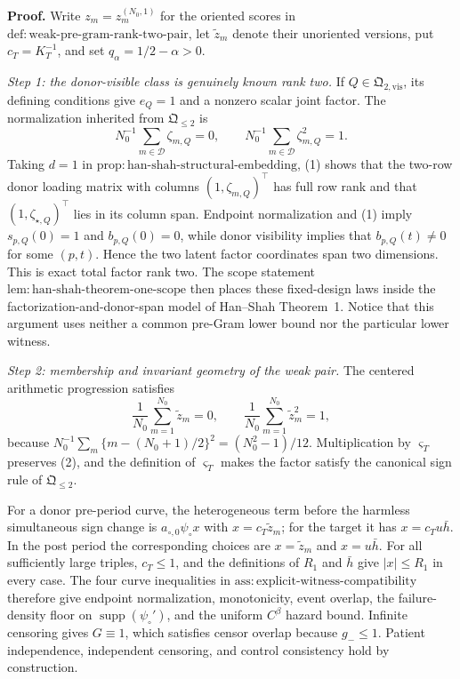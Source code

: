 \textbf{Proof.}
Write \(z_m=z_m^{(N_0,1)}\) for the oriented scores in
\(\mathrm{def:weak\mbox{-}pre\mbox{-}gram\mbox{-}rank\mbox{-}two\mbox{-}pair}\),
let \(\widetilde z_m\) denote their unoriented versions, put
\(c_T=K_T^{-1}\), and set \(q_\alpha=1/2-\alpha>0\).

\emph{Step 1: the donor-visible class is genuinely known rank two.}
If \(Q\in\mathfrak Q_{2,\mathrm{vis}}\), its defining conditions give
\(e_Q=1\) and a nonzero scalar joint factor.  The normalization inherited
from \(\mathfrak Q_{\leq2}\) is
\[
 N_0^{-1}\sum_{m\in\mathcal D}\zeta_{m,Q}=0,
 \qquad
 N_0^{-1}\sum_{m\in\mathcal D}\zeta_{m,Q}^2=1.       \tag{1}
\]
Taking \(d=1\) in
\(\mathrm{prop:han\mbox{-}shah\mbox{-}structural\mbox{-}embedding}\),
(1) shows that the two-row donor loading matrix with columns
\((1,\zeta_{m,Q})^\top\) has full row rank and that
\((1,\zeta_{\star,Q})^\top\) lies in its column span.  Endpoint
normalization and (1) imply \(s_{p,Q}(0)=1\) and \(b_{p,Q}(0)=0\), while
donor visibility implies that \(b_{p,Q}(t)\ne0\) for some \((p,t)\).
Hence the two latent factor coordinates span two dimensions.  This is
exact total factor rank two.  The scope statement
\(\mathrm{lem:han\mbox{-}shah\mbox{-}theorem\mbox{-}one\mbox{-}scope}\)
then places these fixed-design laws inside the factorization-and-donor-span
model of Han--Shah Theorem~1.  Notice that this argument uses neither a
common pre-Gram lower bound nor the particular lower witness.

\emph{Step 2: membership and invariant geometry of the weak pair.}
The centered arithmetic progression satisfies
\[
 \frac1{N_0}\sum_{m=1}^{N_0}\widetilde z_m=0,
 \qquad
 \frac1{N_0}\sum_{m=1}^{N_0}\widetilde z_m^2=1,       \tag{2}
\]
because
\(N_0^{-1}\sum_m\{m-(N_0+1)/2\}^2=(N_0^2-1)/12\).
Multiplication by \(\varsigma_T\) preserves (2), and the definition of
\(\varsigma_T\) makes the factor satisfy the canonical sign rule of
\(\mathfrak Q_{\leq2}\).

For a donor pre-period curve, the heterogeneous term before the harmless
simultaneous sign change is \(a_{\circ,0}\psi_\circ x\) with
\(x=c_T\widetilde z_m\); for the target it has
\(x=c_Tu\bar h\).  In the post period the corresponding choices are
\(x=\widetilde z_m\) and \(x=u\bar h\).  For all sufficiently large
triples, \(c_T\le1\), and the definitions of \(R_1\) and \(\bar h\) give
\(|x|\le R_1\) in every case.  The four curve inequalities in
\(\mathrm{ass:explicit\mbox{-}witness\mbox{-}compatibility}\) therefore
give endpoint normalization, monotonicity, event overlap, the
failure-density floor on \(\operatorname{supp}(\psi_\circ')\), and the
uniform \(C^\beta\) hazard bound.  Infinite censoring gives \(G\equiv1\),
which satisfies censor overlap because \(g_-\le1\).  Patient independence,
independent censoring, and control consistency hold by construction.

